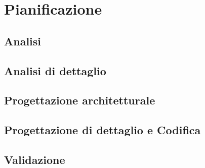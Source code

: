 \documentclass[../PianoDiProgetto.tex]{subfiles}
\begin{document}
	\section{Pianificazione}
		\subsection{Analisi}
			
		\subsection{Analisi di dettaglio}
		
		\subsection{Progettazione architetturale}
		
		\subsection{Progettazione di dettaglio e Codifica}
		
		\subsection{Validazione}
			
\end{document}
